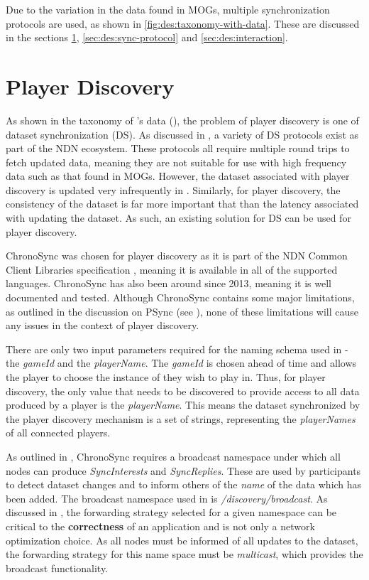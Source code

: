 Due to the variation in the data found in MOGs, multiple synchronization protocols are used, as shown in \ref{fig:des:taxonomy-with-data}. These are discussed in the sections \ref{sec:des:discovery}, \ref{sec:des:sync-protocol} and \ref{sec:des:interaction}. 

\section{Player Discovery}\label{sec:des:discovery}
As shown in the taxonomy of \game{}'s data (), the problem of player discovery is one of dataset synchronization (DS). As discussed in , a variety of DS protocols exist as part of the NDN ecosystem. These protocols all require multiple round trips to fetch updated data, meaning they are not suitable for use with high frequency data such as that found in MOGs. However, the dataset associated with player discovery is updated very infrequently in \game. Similarly, for player discovery, the consistency of the dataset is far more important that than the latency associated with updating the dataset. As such, an existing solution for DS can be used for player discovery.

ChronoSync was chosen for player discovery as it is part of the NDN Common Client Libraries specification \cite{ndn-ccl}, meaning it is available in all of the supported languages. ChronoSync has also been around since 2013, meaning it is well documented and tested. Although ChronoSync contains some major limitations, as outlined in the discussion on PSync (see ), none of these limitations will cause any issues in the context of player discovery.

There are only two input parameters required for the naming schema used in \game{} - the \textit{gameId} and the \textit{playerName}. The \textit{gameId} is chosen ahead of time and allows the player to choose the instance of \game{} they wish to play in. Thus, for player discovery, the only value that needs to be discovered to provide access to all data produced by a player is the \textit{playerName}. This means the dataset synchronized by the player discovery mechanism is a set of strings, representing the \textit{playerNames} of all connected players.

\sloppy As outlined in , ChronoSync requires a broadcast namespace under which all nodes can produce \textit{SyncInterests} and \textit{SyncReplies}. These are used by participants to detect dataset changes and to inform others of the \textit{name} of the data which has been added. The broadcast namespace used in \game{} is \textit{\gameprefix{}/discovery/broadcast}. As discussed in , the forwarding strategy selected for a given namespace can be critical to the \textbf{correctness} of an application and is not only a network optimization choice. As all nodes must be informed of all updates to the dataset, the forwarding strategy for this name space must be \textit{multicast}, which provides the broadcast functionality.

